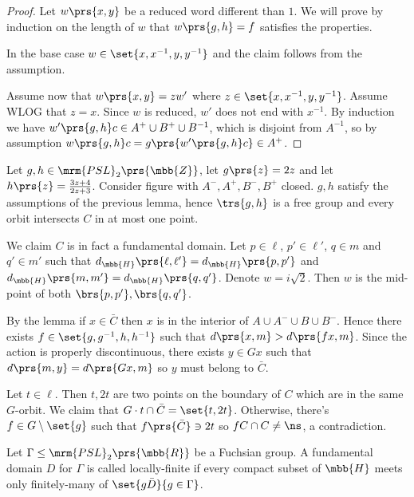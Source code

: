 \documentclass[10pt, twoside]{book}
\begin{document}
\begin{proof}
Let $w\prs{x,y}$ be a reduced word different than $1$. We will prove by induction on the length of $w$ that $w\prs{g,h} = f$ satisfies the properties.

In the base case $w \in \set{x, x^{-1}, y, y^{-1}}$ and the claim follows from the assumption.

Assume now that $w\prs{x,y} = z w'$ where $z \in \set{x, x^{-1}, y, y^{-1}}$. Assume WLOG that $z = x$. Since $w$ is reduced, $w'$ does not end with $x^{-1}$. By induction we have $w'\prs{g,h} c \in A^+ \cup B^+ \cup B^{-1}$, which is disjoint from $A^{-1}$, so by assumption $w\prs{g,h} c = g\prs{w'\prs{g,h} c} \in A^+$.
\end{proof}

\begin{example}
Let $g,h \in \mrm{PSL}_2\prs{\mbb{Z}}$, let $g\prs{z} = 2z$ and let $h\prs{z} = \frac{3z + 4}{2z + 3}$.
Consider figure %
with $A^-, A^+, B^-, B^+$ closed.
$g,h$ satisfy the assumptions of the previous lemma, hence $\trs{g,h}$ is a free group and every orbit intersects $C$ in at most one point.

We claim $C$ is in fact a fundamental domain. Let $p \in \ell$, $p' \in \ell'$, $q \in m$ and $q' \in m'$ such that $d_{\mbb{H}}\prs{\ell, \ell'} = d_{\mbb{H}}\prs{p,p'}$ and $d_{\mbb{H}}\prs{m,m'} = d_{\mbb{H}}\prs{q,q'}$.
Denote $w = i \sqrt{2}$. Then $w$ is the mid-point of both $\brs{p,p'}, \brs{q,q'}$.

By the lemma if $x \in \bar{C}$ then $x$ is in the interior of $A \cup A^- \cup B \cup B^-$.
Hence there exists $f \in \set{g, g^{-1}, h, h^{-1}}$ such that $d\prs{x,m} > d\prs{fx, m}$.
Since the action is properly discontinuous, there exists $y \in G x$ such that $d\prs{m, y} = d\prs{Gx, m}$ so $y$ must belong to $\bar{C}$.

Let $t \in \ell$. Then $t, 2t$ are two points on the boundary of $C$ which are in the same $G$-orbit. We claim that $G \cdot t \cap \bar{C} = \set{t, 2t}$.
Otherwise, there's $f \in G \setminus \set{g}$ such that $f\prs{\bar{C}} \ni 2t$ so $f C \cap C \neq \ns$, a contradiction.
\end{example}

\begin{definition}
Let $\Gamma \leq \mrm{PSL}_2\prs{\mbb{R}}$ be a Fuchsian group. A fundamental domain $D$ for $\Gamma$ is called locally-finite if every compact subset of $\mbb{H}$ meets only finitely-many of $\set{g \bar{D}}{g \in \Gamma}$.
\end{definition}
\end{document}
